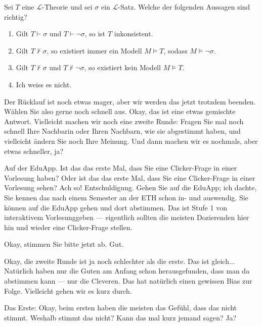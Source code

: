 \begin{nice-box}
\begin{math-stroke}
Sei $T$ eine $\mathcal{L}$-Theorie und sei $\sigma$ ein $\mathcal{L}$-Satz. Welche der folgenden Aussagen sind richtig?
\begin{enumerate}[label=\textbf{\arabic*.}]
    \item Gilt $T \vdash \sigma$ und $T \vdash \neg\sigma$, so ist $T$ inkonsistent.
    \item Gilt $T \not\vdash \sigma$, so existiert immer ein Modell $M \models T$, sodass $M \models \neg\sigma$.
    \item Gilt $T \not\vdash \sigma$ und $T \not\vdash \neg\sigma$, so existiert kein Modell $M \models T$.
    \item Ich weiss es nicht.
\end{enumerate}
\end{math-stroke}
\end{nice-box}

\begin{spoken-clean}[00:01:21 - 00:02:08]
Der Rücklauf ist noch etwas mager, aber wir werden das jetzt trotzdem beenden. Wählen Sie also gerne noch schnell aus. Okay, das ist eine etwas gemischte Antwort. Vielleicht machen wir noch eine zweite Runde: Fragen Sie mal noch schnell Ihre Nachbarin oder Ihren Nachbarn, wie sie abgestimmt haben, und vielleicht ändern Sie noch Ihre Meinung. Und dann machen wir es nochmals, aber etwas schneller, ja?

Auf der EduApp. Ist das das erste Mal, dass Sie eine Clicker-Frage in einer Vorlesung haben? Oder ist das das erste Mal, dass Sie eine Clicker-Frage in einer Vorlesung sehen? Ach so! Entschuldigung. Gehen Sie auf die EduApp; ich dachte, Sie kennen das nach einem Semester an der ETH schon in- und auswendig. Sie können auf die EduApp gehen und dort abstimmen. Das ist Stufe 1 von interaktivem Vorlesunggeben --- eigentlich sollten die meisten Dozierenden hier hin und wieder eine Clicker-Frage stellen.

Okay, stimmen Sie bitte jetzt ab. Gut.
\end{spoken-clean}

\begin{spoken-clean}[00:02:08 - 00:03:18]
Okay, die zweite Runde ist ja noch schlechter als die erste. Das ist gleich... Natürlich haben nur die Guten am Anfang schon herausgefunden, dass man da abstimmen kann --- nur die Cleveren. Das hat natürlich einen gewissen Bias zur Folge. Vielleicht gehen wir es kurz durch.

Das Erste: Okay, beim ersten haben die meisten das Gefühl, dass das nicht stimmt. Weshalb stimmt das nicht? Kann das mal kurz jemand sagen? Ja?
\end{spoken-clean}

